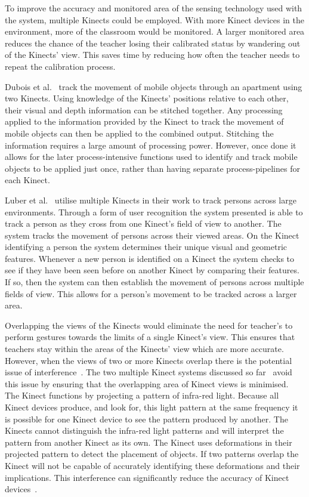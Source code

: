 \documentclass[link]{IWCOMP}
\begin{document}
To improve the accuracy and monitored area of the sensing technology used with the system, multiple Kinects could be employed.
With more Kinect devices in the environment, more of the classroom would be monitored.
A larger monitored area reduces the chance of the teacher losing their calibrated status by wandering out of the Kinects' view.
This saves time by reducing how often the teacher needs to repeat the calibration process.

Dubois et al.~\citep{Dubois2011} track the movement of mobile objects through an apartment using two Kinects.
Using knowledge of the Kinects' positions relative to each other, their visual and depth information can be stitched together.
Any processing applied to the information provided by the Kinect to track the movement of mobile objects can then be applied to the combined output.
Stitching the information requires a large amount of processing power.
However, once done it allows for the later process-intensive functions used to identify and track mobile objects to be applied just once, rather than having separate process-pipelines for each Kinect.

Luber et al.~\citep{Luber2011} utilise multiple Kinects in their work to track persons across large environments.
Through a form of user recognition the system presented is able to track a person as they cross from one Kinect's field of view to another.
The system tracks the movement of persons across their viewed areas.
On the Kinect identifying a person the system determines their unique visual and geometric features.
Whenever a new person is identified on a Kinect the system checks to see if they have been seen before on another Kinect by comparing their features.
If so, then the system can then establish the movement of persons across multiple fields of view.
This allows for a person's movement to be tracked across a larger area.

Overlapping the views of the Kinects would eliminate the need for teacher's to perform gestures towards the limits of a single Kinect's view.
This ensures that teachers stay within the areas of the Kinects' view which are more accurate.
However, when the views of two or more Kinects overlap there is the potential issue of interference~\citep{Satyavolu2012}.
The two multiple Kinect systems discussed so far~\citep{Dubois2011,Luber2011} avoid this issue by ensuring that the overlapping area of Kinect views is minimised.
The Kinect functions by projecting a pattern of infra-red light.
Because all Kinect devices produce, and look for, this light pattern at the same frequency it is possible for one Kinect device to see the pattern produced by another.
The Kinects cannot distinguish the infra-red light patterns and will interpret the pattern from another Kinect as its own.
The Kinect uses deformations in their projected pattern to detect the placement of objects.
If two patterns overlap the Kinect will not be capable of accurately identifying these deformations and their implications.
This interference can significantly reduce the accuracy of Kinect devices~\citep{Satyavolu2012}.
\end{document}

